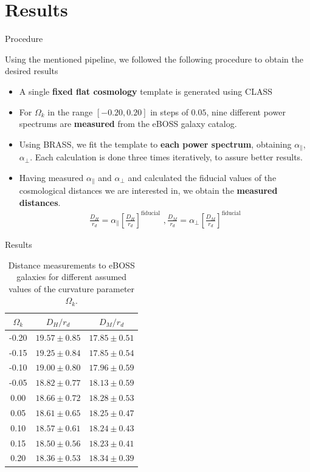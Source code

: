 \documentclass{beamer}
\begin{document}
\section{Results}
\begin{frame}{Procedure}

Using the mentioned pipeline, we followed the following procedure to obtain the desired results
\begin{itemize}
	\item A single \textbf{fixed flat cosmology} template is generated using CLASS
	\item For $\Omega_k$ in the range $\left[ -0.20, 0.20 \right] $ in steps of $0.05$, nine different power spectrums are \textbf{measured} from the eBOSS galaxy catalog.
	\item Using BRASS, we fit the template to \textbf{each power spectrum}, obtaining $\alpha_\parallel$, $\alpha_\perp$. Each calculation is done three times iteratively, to assure better results.
	\item Having measured  $\alpha_\parallel$ and $\alpha_\perp$ and calculated the fiducial values of the cosmological distances we are interested in, we obtain the \textbf{measured distances}.
	\vspace{-0.2cm}
		\begin{align}
			\frac{D_H}{r_d} = \alpha_\parallel \left[ \frac{D_H}{r_d} \right] ^\text{fiducial}\,\,,
			\frac{D_M}{r_d} = \alpha_\perp \left[ \frac{D_M}{r_d} \right] ^\text{fiducial}
		\end{align}
\end{itemize}
	 
\end{frame}
\begin{frame}{Results}
\begin{table}
	\begin{center}
\begin{tabular}{|c|c|c|}
	\hline
$\Omega_k$ & $D_H/r_d$ & $D_M/r_d$ \\
\hline
-0.20 & $19.57 \pm 0.85$ & $17.85 \pm 0.51$ \\
-0.15 & $19.25 \pm 0.84$ & $17.85 \pm 0.54$ \\
-0.10& $19.00 \pm 0.80$ & $17.96 \pm 0.59$ \\
-0.05 & $18.82 \pm 0.77$ & $18.13 \pm 0.59$ \\
0.00 & $18.66 \pm 0.72$ & $18.28 \pm 0.53$ \\
0.05 & $18.61 \pm 0.65$ & $18.25 \pm 0.47$ \\
0.10 & $18.57 \pm 0.61$ & $18.24 \pm 0.43$ \\
0.15 & $18.50\pm 0.56$ & $18.23 \pm 0.41$ \\
0.20 & $18.36 \pm 0.53$ & $18.34 \pm 0.39$ \\
\hline
\end{tabular}
\end{center}
\caption{Distance measurements to eBOSS galaxies for different assumed values of the curvature parameter $\Omega_k$.}	
\label{tab:DA_DH}
\end{table}
	 
\end{frame}
\end{document}
